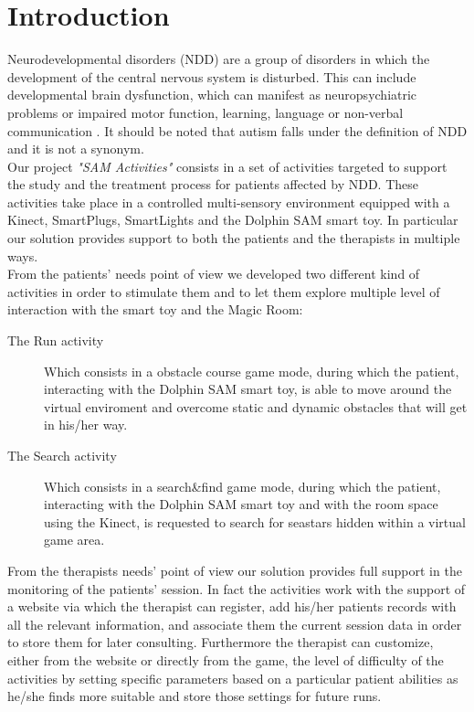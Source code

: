 
	\chapter{Introduction}
	
Neurodevelopmental disorders (NDD) are a group of disorders in which the development of the central nervous system is disturbed. This can include developmental brain dysfunction, which can manifest as neuropsychiatric problems or impaired motor function, learning, language or non-verbal communication \cite{Nature}.
It should be noted that autism falls under the definition of NDD and it is not a synonym.\\


\noindent Our project \textit{"SAM Activities"} consists in a set of activities targeted to support the study and the treatment process for patients affected by NDD. These activities take place in a controlled multi-sensory environment 
equipped with a Kinect, SmartPlugs, SmartLights and the Dolphin SAM smart toy.
In particular our solution provides support to both the patients and the therapists in multiple ways.\\


\noindent From the patients’ needs point of view we developed two different kind of activities in order to stimulate them and to let them explore multiple level of interaction with the smart toy and the Magic Room:
\begin{description}
	\item [The Run activity] Which consists in a obstacle course game mode, during which the patient, interacting with the Dolphin SAM smart toy, is able to move around the virtual enviroment and overcome static and dynamic obstacles that will get in his/her way.
	\item [The Search activity] Which consists in a search\&find game mode, during which the patient, interacting with the Dolphin SAM smart toy and with the room space using the Kinect, is requested to search for seastars hidden within a virtual game area.
\end{description}
From the therapists needs' point of view our solution provides full support in the monitoring of the patients’ session. In fact the activities work with the support of a website via which the therapist can register, add his/her patients records with all the relevant information, and associate them the current session data in order to store them for later consulting. %
 Furthermore the therapist can customize, either from the website or directly from the game, the level of difficulty of the activities by setting specific parameters based on a particular patient abilities as he/she finds more suitable and store those settings for future runs.
	